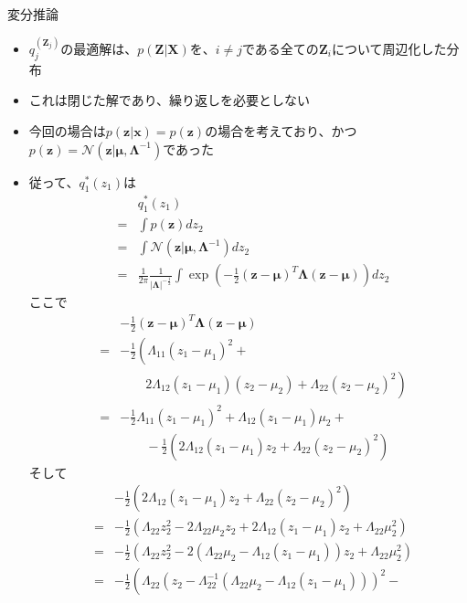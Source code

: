 \documentclass[dvipdfmx,notheorems,t]{beamer}
\begin{document}
\begin{frame}{変分推論}
\begin{itemize}
\begin{itemize}
		\item $q_j^(\bm{Z}_j)$の最適解は、$p(\bm{Z} | \bm{X})$を、$i \neq j$である全ての$\bm{Z}_i$について周辺化した分布
		\item これは閉じた解であり、繰り返しを必要としない
		\newline
		
		\item 今回の場合は$p(\bm{z} | \bm{x}) = p(\bm{z})$の場合を考えており、かつ$p(\bm{z}) = \mathcal{N}(\bm{z} | \bm{\mu}, \bm{\Lambda}^{-1})$であった
		\newline
		
		\item 従って、$q_1^*(z_1)$は
		\begin{eqnarray}
			&& q_1^*(z_1) \nonumber \\
			&=& \int p(\bm{z}) dz_2 \nonumber \\
			&=& \int \mathcal{N}(\bm{z} | \bm{\mu}, \bm{\Lambda}^{-1}) dz_2 \\
			&=& \frac{1}{2\pi} \frac{1}{|\bm{\Lambda}|^{-\frac{1}{2}}} \int \exp \left( -\frac{1}{2} (\bm{z} - \bm{\mu})^T \bm{\Lambda} (\bm{z} - \bm{\mu}) \right) dz_2
		\end{eqnarray}
		ここで
		\begin{eqnarray}
			&& -\frac{1}{2} (\bm{z} - \bm{\mu})^T \bm{\Lambda} (\bm{z} - \bm{\mu}) \nonumber \\
			&=& -\frac{1}{2} \left( \Lambda_{11} (z_1 - \mu_1)^2 + \right. \nonumber \\
			&& \qquad \left. 2 \Lambda_{12} (z_1 - \mu_1)(z_2 - \mu_2) + \Lambda_{22} (z_2 - \mu_2)^2 \right) \\
			&=& -\frac{1}{2} \Lambda_{11} (z_1 - \mu_1)^2 + \Lambda_{12} (z_1 - \mu_1) \mu_2 + \nonumber \\
			&& \qquad -\frac{1}{2} \left( 2 \Lambda_{12} (z_1 - \mu_1) z_2 + \Lambda_{22} (z_2 - \mu_2)^2 \right)
		\end{eqnarray}
		そして
		\begin{eqnarray}
			&& -\frac{1}{2} \left( 2 \Lambda_{12} (z_1 - \mu_1) z_2 + \Lambda_{22} (z_2 - \mu_2)^2 \right) \nonumber \\
			&=& -\frac{1}{2} \left( \Lambda_{22} z_2^2 - 2 \Lambda_{22} \mu_2 z_2 + 2 \Lambda_{12} (z_1 - \mu_1) z_2 + \Lambda_{22} \mu_2^2 \right) \\
			&=& -\frac{1}{2} \left( \Lambda_{22} z_2^2 - 2 \left( \Lambda_{22} \mu_2 - \Lambda_{12} (z_1 - \mu_1) \right) z_2 + \Lambda_{22} \mu_2^2 \right) \\
			&=& -\frac{1}{2} \left( \Lambda_{22} \left( z_2 - \Lambda_{22}^{-1} \left( \Lambda_{22} \mu_2 - \Lambda_{12} (z_1 - \mu_1) \right) \right)^2 - \right. \nonumber \\

\end{eqnarray}
\end{itemize}
\end{itemize}
\end{frame}
\end{document}
